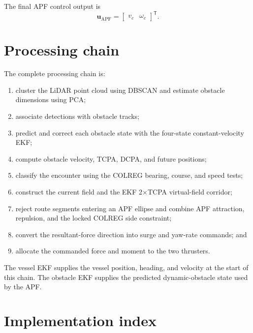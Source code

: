 \documentclass[11pt,a4paper]{article}
\begin{document}
The final APF control output is
\begin{equation}
\bm{u}_{\mathrm{APF}}=
\begin{bmatrix}v_c&\omega_c\end{bmatrix}^{\mathsf T}.
\end{equation}

\section{Processing chain}

The complete processing chain is:
\begin{enumerate}
  \item cluster the LiDAR point cloud using DBSCAN and estimate obstacle dimensions using PCA;
  \item associate detections with obstacle tracks;
  \item predict and correct each obstacle state with the four-state constant-velocity EKF;
  \item compute obstacle velocity, TCPA, DCPA, and future positions;
  \item classify the encounter using the COLREG bearing, course, and speed tests;
  \item construct the current field and the EKF 2$\times$TCPA virtual-field corridor;
  \item reject route segments entering an APF ellipse and combine APF attraction, repulsion, and the locked COLREG side constraint;
  \item convert the resultant-force direction into surge and yaw-rate commands; and
  \item allocate the commanded force and moment to the two thrusters.
\end{enumerate}

The vessel EKF supplies the vessel position, heading, and velocity at the start of this chain. The obstacle EKF supplies the predicted dynamic-obstacle state used by the APF.

\section{Implementation index}
\end{document}

